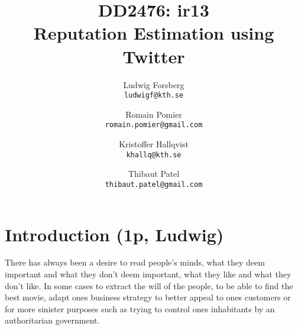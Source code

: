 \documentclass[landscape,letterpaper,40pt]{extarticle}
\title{\TitleFontTwo DD2476: ir13 \\ \TitleFont Reputation Estimation using Twitter}
\author{Ludwig Forsberg \\ \texttt{ludwigf@kth.se} \and Romain Pomier \\ \texttt{romain.pomier@gmail.com} \and Kristoffer Hallqvist \\ \texttt{khallq@kth.se} \and Thibaut Patel \\ \texttt{thibaut.patel@gmail.com}}
\begin{document}
\thefontsize\Huge

\maketitle

\clearpage
\chapter{Introduction (1p, Ludwig)}

There has always been a desire to read people's minds, what they deem important and what they don't deem important, what they like and what they don't like. 
In some cases to extract the will of the people, to be able to find the best movie, adapt ones business strategy to better appeal to ones customers or for more sinister purposes such as trying to control ones inhabitants by an authoritarian government.
\end{document}
